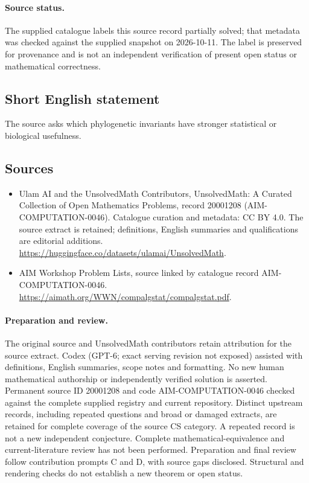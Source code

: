 \documentclass[11pt]{article}
\begin{document}
\paragraph{Source status.}
The supplied catalogue labels this source record partially solved; that metadata was checked against the supplied snapshot on 2026-10-11. The label is preserved for provenance and is not an independent verification of present open status or mathematical correctness.
\subsection{Short English statement}
The source asks which phylogenetic invariants have stronger statistical or biological usefulness.
\subsection{Sources}
\begin{itemize}
\item[\hypertarget{source:20001208:1}{S1}] Ulam AI and the UnsolvedMath Contributors, UnsolvedMath: A Curated Collection of Open Mathematics Problems, record 20001208 (AIM-COMPUTATION-0046). Catalogue curation and metadata: CC BY 4.0. The source extract is retained; definitions, English summaries and qualifications are editorial additions.
\url{https://huggingface.co/datasets/ulamai/UnsolvedMath}.
\item[\hypertarget{source:20001208:2}{S2}] AIM Workshop Problem Lists, source linked by catalogue record AIM-COMPUTATION-0046.
\url{https://aimath.org/WWN/compalgstat/compalgstat.pdf}.
\end{itemize}
\paragraph{Preparation and review.}
The original source and UnsolvedMath contributors retain attribution for the source extract. Codex (GPT-6; exact serving revision not exposed) assisted with definitions, English summaries, scope notes and formatting. No new human mathematical authorship or independently verified solution is asserted. Permanent source ID 20001208 and code AIM-COMPUTATION-0046 checked against the complete supplied registry and current repository. Distinct upstream records, including repeated questions and broad or damaged extracts, are retained for complete coverage of the source CS category. A repeated record is not a new independent conjecture. Complete mathematical-equivalence and current-literature review has not been performed. Preparation and final review follow contribution prompts C and D, with source gaps disclosed. Structural and rendering checks do not establish a new theorem or open status.
\label{end:20001208}
\end{document}
